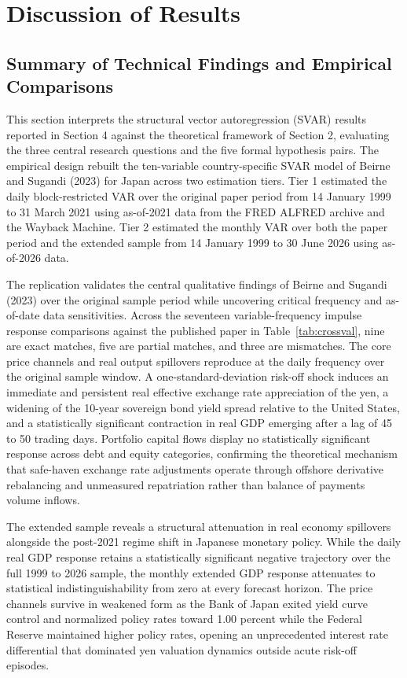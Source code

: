 \section{Discussion of Results}

\subsection{Summary of Technical Findings and Empirical Comparisons}

This section interprets the structural vector autoregression (SVAR) results reported in Section 4 against the theoretical framework of Section 2, evaluating the three central research questions and the five formal hypothesis pairs. The empirical design rebuilt the ten-variable country-specific SVAR model of Beirne and Sugandi (2023) for Japan across two estimation tiers. Tier 1 estimated the daily block-restricted VAR over the original paper period from 14 January 1999 to 31 March 2021 using as-of-2021 data from the FRED ALFRED archive and the Wayback Machine. Tier 2 estimated the monthly VAR over both the paper period and the extended sample from 14 January 1999 to 30 June 2026 using as-of-2026 data.

The replication validates the central qualitative findings of Beirne and Sugandi (2023) over the original sample period while uncovering critical frequency and as-of-date data sensitivities. Across the seventeen variable-frequency impulse response comparisons against the published paper in Table~\ref{tab:crossval}, nine are exact matches, five are partial matches, and three are mismatches. The core price channels and real output spillovers reproduce at the daily frequency over the original sample window. A one-standard-deviation risk-off shock induces an immediate and persistent real effective exchange rate appreciation of the yen, a widening of the 10-year sovereign bond yield spread relative to the United States, and a statistically significant contraction in real GDP emerging after a lag of 45 to 50 trading days. Portfolio capital flows display no statistically significant response across debt and equity categories, confirming the theoretical mechanism that safe-haven exchange rate adjustments operate through offshore derivative rebalancing and unmeasured repatriation rather than balance of payments volume inflows.

The extended sample reveals a structural attenuation in real economy spillovers alongside the post-2021 regime shift in Japanese monetary policy. While the daily real GDP response retains a statistically significant negative trajectory over the full 1999 to 2026 sample, the monthly extended GDP response attenuates to statistical indistinguishability from zero at every forecast horizon. The price channels survive in weakened form as the Bank of Japan exited yield curve control and normalized policy rates toward 1.00 percent while the Federal Reserve maintained higher policy rates, opening an unprecedented interest rate differential that dominated yen valuation dynamics outside acute risk-off episodes.

